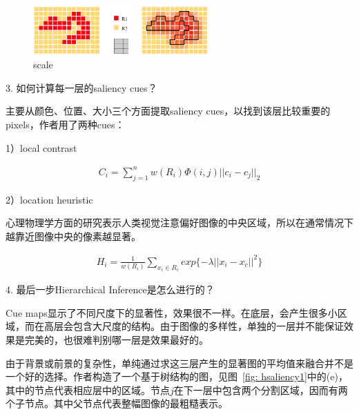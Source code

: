 \documentclass[12pt]{article}
\begin{document}
\begin{figure}[!ht]
\centering
\includegraphics[width=0.6\textwidth]{hsaliency4.png}
\caption{scale}
\label{fig: hsaliency4}
\end{figure}

3. 如何计算每一层的saliency cues？

主要从颜色、位置、大小三个方面提取saliency cues，以找到该层比较重要的pixels，作者用了两种cues：

1）local contrast

\begin{align}
C_i = \sum_{j=1}^{n}w(R_i)\Phi(i, j)||c_i-c_j||_2
\end{align}


2）location heuristic

心理物理学方面的研究表示人类视觉注意偏好图像的中央区域，所以在通常情况下越靠近图像中央的像素越显著。

\begin{align}
H_i = \frac{1}{w(R_i)}\sum_{x_i \in R_i} exp\{-\lambda||x_i-x_c||^2\}
\end{align}

4. 最后一步Hierarchical Inference是怎么进行的？

Cue maps显示了不同尺度下的显著性，效果很不一样。在底层，会产生很多小区域，而在高层会包含大尺度的结构。由于图像的多样性，单独的一层并不能保证效果是完美的，也很难判别哪一层是效果最好的。

由于背景或前景的复杂性，单纯通过求这三层产生的显著图的平均值来融合并不是一个好的选择。作者构造了一个基于树结构的图，见图~\ref{fig: hsaliency1}中的(e)，其中的节点代表相应层中的区域。节点$j$在下一层中包含两个分割区域，因而有两个子节点。其中父节点代表整幅图像的最粗糙表示。

%


\end{document}
